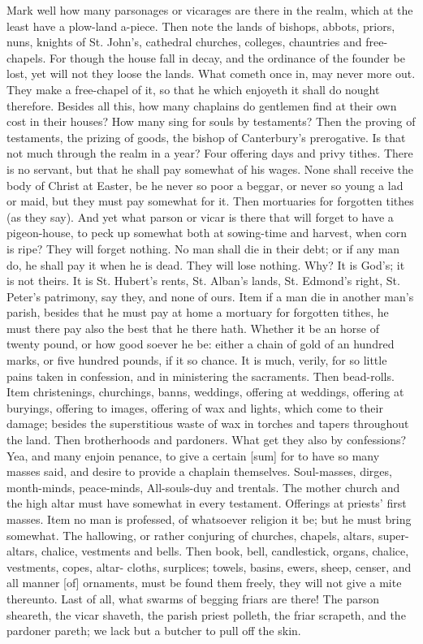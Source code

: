 Mark well how many parsonages or vicarages are there 
in the realm, which at the least have a plow-land a-piece. 
Then note the lands of bishops, abbots, priors, nuns, 
knights of St. John's, cathedral churches, colleges, 
chauntries and free-chapels. For though the house fall 
in decay, and the ordinance of the founder be lost, yet 
will not they loose the lands. What cometh once in, may 
never more out. They make a free-chapel of it, so that 
he which enjoyeth it shall do nought therefore. Besides 
all this, how many chaplains do gentlemen find at their 
own cost in their houses? How many sing for souls by 
testaments? Then the proving of testaments, the prizing 
of goods, the bishop of Canterbury's prerogative. Is that 
not much through the realm in a year? Four offering 
days and privy tithes. There is no servant, but that he 
shall pay somewhat of his wages. None shall receive 
the body of Christ at Easter, be he never so poor a 
beggar, or never so young a lad or maid, but they must 
pay somewhat for it. Then mortuaries for forgotten tithes 
(as they say). And yet what parson or vicar is there that 
will forget to have a pigeon-house, to peck up somewhat
both at sowing-time and harvest, when corn is ripe? 
They will forget nothing. No man shall die in their 
debt; or if any man do, he shall pay it when he is dead. 
They will lose nothing. Why? It is God's; it is not 
theirs. It is St. Hubert's rents, St. Alban's lands, St. 
Edmond's right, St. Peter's patrimony, say they, and none 
of ours. Item if a man die in another man's parish, besides
that he must pay at home a mortuary for forgotten 
tithes, he must there pay also the best that he there hath. 
Whether it be an horse of twenty pound, or how good 
soever he be: either a chain of gold of an hundred 
marks, or five hundred pounds, if it so chance. It is 
much, verily, for so little pains taken in confession, and 
in ministering the sacraments. Then bead-rolls. Item 
christenings, churchings, banns, weddings, offering at weddings,
offering at buryings, offering to images, offering of wax 
and lights, which come to their damage; besides the superstitious
waste of wax in torches and tapers throughout 
the land. Then brotherhoods and pardoners. What get 
they also by confessions? Yea, and many enjoin penance, 
to give a certain [sum] for to have so many masses said, and 
desire to provide a chaplain themselves. Soul-masses, 
dirges, month-minds, peace-minds, All-souls-duy and 
trentals. The mother church and the high altar must 
have somewhat in every testament. Offerings at priests' 
first masses. Item no man is professed, of whatsoever 
religion it be; but he must bring somewhat. The hallowing,
or rather conjuring of churches, chapels, altars, 
super-altars, chalice, vestments and bells. Then book, 
bell, candlestick, organs, chalice, vestments, copes, altar- 
cloths, surplices; towels, basins, ewers, sheep, censer, 
and all manner [of] ornaments, must be found them freely, 
they will not give a mite thereunto. Last of all, what 
swarms of begging friars are there! The parson sheareth, 
the vicar shaveth, the parish priest polleth, the friar 
scrapeth, and the pardoner pareth; we lack but a butcher 
to pull off the skin. 

